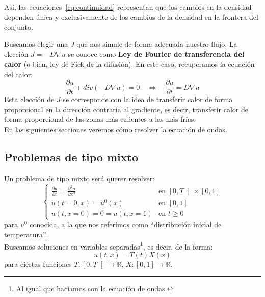 \noindent
Así, las ecuaciones~\eqref{eq:continuidad} representan que los cambios en la densidad dependen única y exclusivamente de los cambios de la densidad en la frontera del conjunto. 

Buscamos elegir una $J$ que nos simule de forma adecuada nuestro flujo. La elección $J = -D\nabla u$ se conoce como \textbf{Ley de Fourier de transferencia del calor} (o bien, ley de Fick de la difusión). En este caso, recuperamos la ecuación del calor:
\begin{equation*}
    \frac{\partial u}{\partial t}+div(-D\nabla u) = 0 \quad\Longrightarrow\quad \frac{\partial u}{\partial t}=D\nabla u
\end{equation*}
Esta elección de $J$ se corresponde con la idea de transferir calor de forma proporcional en la dirección contraria al gradiente, es decir, transferir calor de forma proporcional de las zonas más calientes a las más frías.\\

\noindent
En las siguientes secciones veremos cómo resolver la ecuación de ondas.

\subsection{Problemas de tipo mixto}
\noindent
Un problema de tipo mixto será querer resolver:
\begin{equation*}
    \left\{\begin{array}{ll}
            \displaystyle \frac{\partial u}{\partial t} = \frac{\partial^2u}{\partial x^2} & \text{en\ } \left[0,T\right[\times [0,1] \\
                u(t=0,x)=u^0(x) & \text{en\ } [0,1] \\
                u(t,x=0)= 0 = u(t,x=1) & \text{en\ } t\geq 0
    \end{array}\right.
\end{equation*}
para $u^0$ conocida, a la que nos referimos como ``distribución inicial de temperatura''.\\

\noindent
Buscamos soluciones en variables separadas\footnote{Al igual que hacíamos con la ecuación de ondas.}, es decir, de la forma:
\begin{equation*}
    u(t,x) = T(t)X(x)
\end{equation*}
para ciertas funciones $T:\left[0,T\right[\to\mathbb{R}$, $X:[0,1]\to \mathbb{R}$.\\

